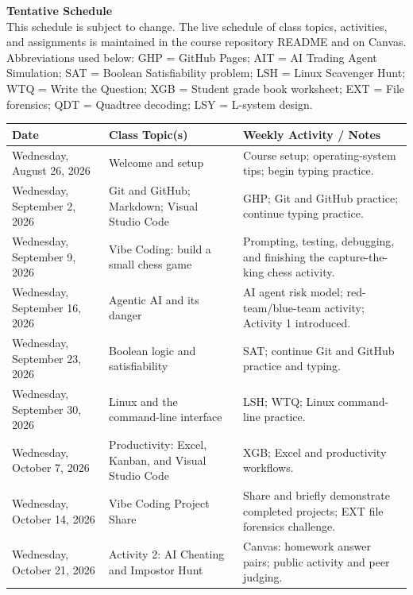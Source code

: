 \documentclass[11pt,letterpaper]{article}
\newcommand{\lefthead}[2]{\noindent\textbf{#1}\hfill\\[#2]}
\begin{document}
\newpage

\lefthead{Tentative Schedule}{0.3cm}
This schedule is subject to change. The live schedule of class topics, activities, and assignments is maintained in the course repository README and on Canvas. Abbreviations used below: GHP = GitHub Pages; AIT = AI Trading Agent Simulation; SAT = Boolean Satisfiability problem; LSH = Linux Scavenger Hunt; WTQ = Write the Question; XGB = Student grade book worksheet; EXT = File forensics; QDT = Quadtree decoding; LSY = L-system design.


\begin{center}
\small
\begin{tabularx}{0.98\textwidth}{|>{\raggedright\arraybackslash}p{}|>{\raggedright\arraybackslash}X|>{\raggedright\arraybackslash}p{}|}
\hline
\textbf{Date} & \textbf{Class Topic(s)} & \textbf{Weekly Activity / Notes} \\ \hline
Wednesday, August 26, 2026 & Welcome and setup & Course setup; operating-system tips; begin typing practice. \\ \hline
Wednesday, September 2, 2026 & Git and GitHub; Markdown; Visual Studio Code & GHP; Git and GitHub practice; continue typing practice. \\ \hline
Wednesday, September 9, 2026 & Vibe Coding: build a small chess game & Prompting, testing, debugging, and finishing the capture-the-king chess activity. \\ \hline
Wednesday, September 16, 2026 & Agentic AI and its danger & AI agent risk model; red-team/blue-team activity; Activity 1 introduced. \\ \hline
Wednesday, September 23, 2026 & Boolean logic and satisfiability & SAT; continue Git and GitHub practice and typing. \\ \hline
Wednesday, September 30, 2026 & Linux and the command-line interface & LSH; WTQ; Linux command-line practice. \\ \hline
Wednesday, October 7, 2026 & Productivity: Excel, Kanban, and Visual Studio Code & XGB; Excel and productivity workflows. \\ \hline
Wednesday, October 14, 2026 & Vibe Coding Project Share & Share and briefly demonstrate completed projects; EXT file forensics challenge. \\ \hline
Wednesday, October 21, 2026 & Activity 2: AI Cheating and Impostor Hunt & Canvas: homework answer pairs; public activity and peer judging. \\ \hline

\end{tabularx}
\end{center}
\end{document}
